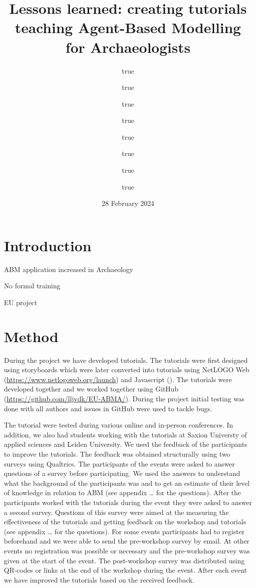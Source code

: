 \documentclass[
]{article}
\title{Lessons learned: creating tutorials teaching Agent-Based
Modelling for Archaeologists}
\author{true \and true \and true \and true \and true \and true \and true \and true}
\date{28 February 2024}
\begin{document}
\maketitle

\hypertarget{introduction}{%
\section{Introduction}\label{introduction}}

ABM application increased in Archaeology

No formal training

EU project

\hypertarget{method}{%
\section{Method}\label{method}}

During the project we have developed tutorials. The tutorials were first
designed using storyboards which were later converted into tutorials
using NetLOGO Web (\url{https://www.netlogoweb.org/launch}) and
Javascript (). The tutorials were developed together and we worked
together using GitHub (\url{https://github.com/lljvdk/EU-ABMA/}). During
the project initial testing was done with all authors and issues in
GitHub were used to tackle bugs.

The tutorial were tested during various online and in-person
conferences. In addition, we also had students working with the
tutorials at Saxion Universty of applied sciences and Leiden University.
We used the feedback of the participants to improve the tutorials. The
feedback was obtained structurally using two surveys using Qualtrics.
The participants of the events were asked to answer questions of a
survey before participating. We used the answers to understand what the
background of the participants was and to get an estimate of their level
of knowledge in relation to ABM (see appendix \ldots{} for the
questions). After the participants worked with the tutorials during the
event they were asked to answer a second survey. Questions of this
survey were aimed at the measuring the effectiveness of the tutorials
and getting feedback on the workshop and tutorials (see appendix
\ldots{} for the questions). For some events participants had to
register beforehand and we were able to send the pre-workshop survey by
email. At other events no registration was possible or necessary and the
pre-workshop survey was given at the start of the event. The
post-workshop survey was distributed using QR-codes or links at the end
of the workshop during the event. After each event we have improved the
tutorials based on the received feedback.
\end{document}
